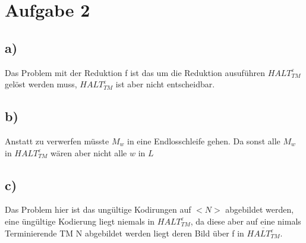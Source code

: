 \section*{Aufgabe 2}

\subsection*{a)}
	Das Problem mit der Reduktion f ist das um die Reduktion ausuführen $HALT^{\varepsilon}_{TM}$ gelöst werden muss, $HALT^{\varepsilon}_{TM}$ ist aber nicht entscheidbar.
	
\subsection*{b)}
	Anstatt zu verwerfen müsste $M_w$ in eine Endlosschleife gehen.
	Da sonst alle $M_w$ in $HALT^{\varepsilon}_{TM}$ wären aber nicht alle $w$ in $L$
	
\subsection*{c)}
Das Problem hier ist das ungültige Kodirungen auf $<N>$ abgebildet werden, eine üngültige Kodierung liegt niemals in  $HALT^{\varepsilon}_{TM}$, da diese aber auf eine nimals Terminierende TM N abgebildet werden liegt deren Bild über f in $\overline{HALT^{\varepsilon}_{TM}}$.